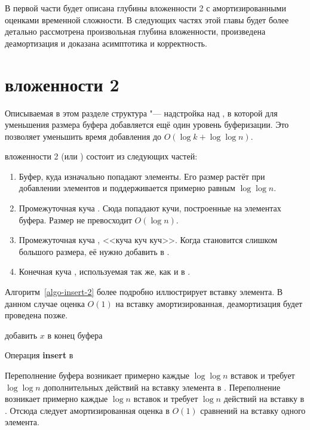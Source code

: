 В первой части будет описана \CH глубины вложенности 2 с амортизированными оценками
временной сложности. В следующих частях этой главы будет более детально рассмотрена
произвольная глубина вложенности, произведена деамортизация и доказана асимптотика
и корректность.

\section{\CH вложенности 2}
Описываемая в этом разделе структура "--- надстройка над \SCH, в которой
для уменьшения размера буфера добавляется ещё один уровень буферизации.
Это позволяет уменьшить время добавления до $O(\log k + \log \log n)$.

\CH вложенности 2 (или \CH[2]) состоит из следующих частей:

\begin{enumerate}
\item Буфер, куда изначально попадают элементы. Его размер растёт при добавлении
    элементов и поддерживается примерно равным $\log \log n$.
\item Промежуточная куча \MH[1]. Сюда попадают кучи, построенные на элементах
    буфера. Размер \MH[1] не превосходит $O(\log n)$.
\item Промежуточная куча \MH[2], <<куча куч куч>>. Когда \MH[1] становится
    слишком большого размера, её нужно добавить в \MH[2].
\item Конечная куча \HH, используемая так же, как и в \SCH.
\end{enumerate}

Алгоритм~\ref{algo-insert-2} более подробно иллюстрирует вставку элемента.
В данном случае оценка $O(1)$ на вставку амортизированная, деамортизация будет
проведена позже.

\begin{algorithm}[h]
 добавить $x$ в конец буфера\;
 \caption{Операция \textbf{insert} в \CH[2]}
 \label{algo-insert-2}
\end{algorithm}

Переполнение буфера возникает примерно каждые $\log\log n$ вставок
и требует $\log \log n$ дополнительных действий на вставку элемента
в \MH[1]. Переполнение
\MH[1] возникает примерно каждые $\log n$ вставок и требует $\log n$
действий на вставку в \MH[2]. Отсюда следует амортизированная оценка
в $O(1)$ сравнений на вставку одного элемента.

